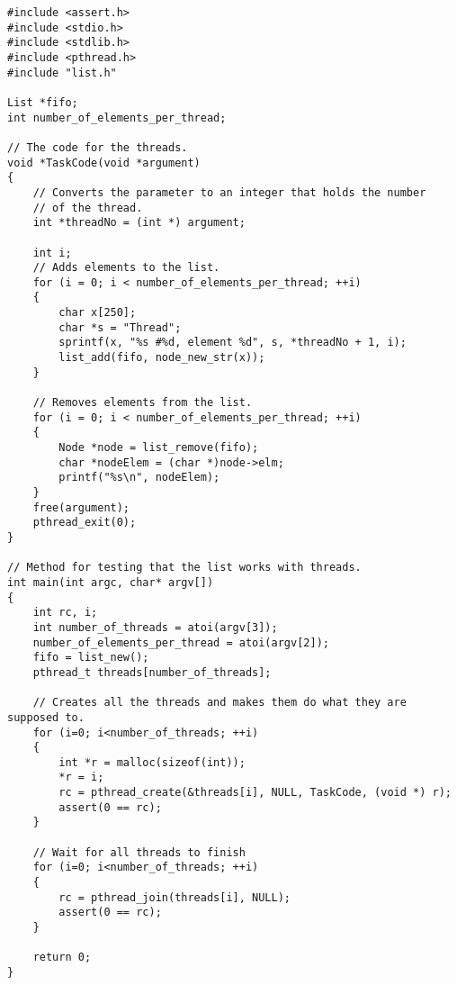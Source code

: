 \begin{lstlisting}
#include <assert.h>
#include <stdio.h>
#include <stdlib.h>
#include <pthread.h>
#include "list.h"

List *fifo;
int number_of_elements_per_thread;

// The code for the threads.
void *TaskCode(void *argument)
{
    // Converts the parameter to an integer that holds the number
    // of the thread.
    int *threadNo = (int *) argument;

    int i;
    // Adds elements to the list.
    for (i = 0; i < number_of_elements_per_thread; ++i)
    {
        char x[250];
        char *s = "Thread";
        sprintf(x, "%s #%d, element %d", s, *threadNo + 1, i);
        list_add(fifo, node_new_str(x));
    }

    // Removes elements from the list.
    for (i = 0; i < number_of_elements_per_thread; ++i)
    {
        Node *node = list_remove(fifo);
        char *nodeElem = (char *)node->elm;
        printf("%s\n", nodeElem);
    }
	free(argument);
    pthread_exit(0);
}

// Method for testing that the list works with threads.
int main(int argc, char* argv[])
{
    int rc, i;
    int number_of_threads = atoi(argv[3]);
    number_of_elements_per_thread = atoi(argv[2]);
    fifo = list_new();
    pthread_t threads[number_of_threads];

    // Creates all the threads and makes them do what they are supposed to.
    for (i=0; i<number_of_threads; ++i) 
    {
		int *r = malloc(sizeof(int));
		*r = i;
        rc = pthread_create(&threads[i], NULL, TaskCode, (void *) r);
        assert(0 == rc);
    }
  
    // Wait for all threads to finish
    for (i=0; i<number_of_threads; ++i) 
    {
        rc = pthread_join(threads[i], NULL);
        assert(0 == rc);
    }

    return 0;
}

\end{lstlisting}